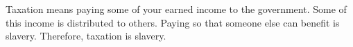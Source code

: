 \begin{exercises}
%

\item Taxation means paying some of your earned income to the government. Some of this income is distributed to others. Paying so that someone else can benefit is slavery. Therefore, taxation is slavery.


%
\end{exercises}


